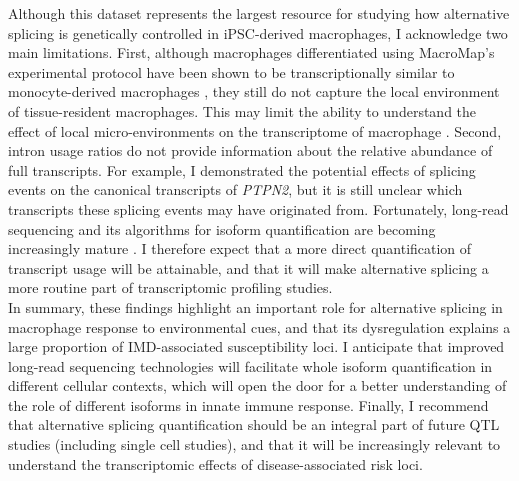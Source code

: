 Although this dataset represents the largest resource for studying how alternative splicing is genetically controlled in iPSC-derived macrophages, I acknowledge two main limitations. First, although macrophages differentiated using MacroMap's experimental protocol have been shown to be transcriptionally similar to monocyte-derived macrophages \cite{Alasoo2018-pv}, they still do not capture the local environment of tissue-resident macrophages. This may limit the ability to understand the effect of local micro-environments on the transcriptome of macrophage \cite{Lavin2014-fb}. Second, intron usage ratios do not provide information about the relative abundance of full transcripts. For example, I demonstrated the potential effects of splicing events on the canonical transcripts of \textit{PTPN2}, but it is still unclear which transcripts these splicing events may have originated from. Fortunately, long-read sequencing and its algorithms for isoform quantification are becoming increasingly mature \cite{AlKhafaji2021-af,Amarasinghe2020-ci,Hu2021-bv}. I therefore expect that a more direct quantification of transcript usage will be attainable, and that it will make alternative splicing a more routine part of transcriptomic profiling studies. \\

In summary, these findings highlight an important role for alternative splicing in macrophage response to environmental cues, and that its dysregulation explains a large proportion of IMD-associated susceptibility loci. I anticipate that improved long-read sequencing technologies will facilitate whole isoform quantification in different cellular contexts, which will open the door for a better understanding of the role of different isoforms in innate immune response. Finally, I recommend that alternative splicing quantification should be an integral part of future QTL studies (including single cell studies), and that it will be increasingly relevant to understand the transcriptomic effects of disease-associated risk loci. 
\newpage





